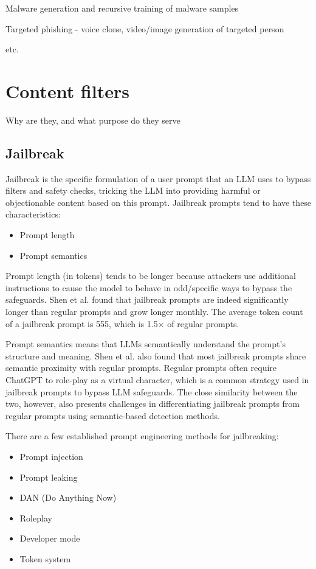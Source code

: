 Malware generation and recursive training of malware samples

Targeted phishing - voice clone, video/image generation of targeted person

etc.

\section{Content filters}
Why are they, and what purpose do they serve

\subsection{Jailbreak}
Jailbreak is the specific formulation of a user prompt that an LLM uses to bypass filters and safety checks, tricking the LLM into providing harmful or objectionable content based on this prompt.
Jailbreak prompts tend to have these characteristics:
\begin{itemize}
    \item Prompt length
    \item Prompt semantics
\end{itemize}

Prompt length (in tokens) tends to be longer because attackers use additional instructions to cause the model to behave in odd/specific ways to bypass the safeguards.
Shen et al.\cite{shen2024donowcharacterizingevaluating} found that jailbreak prompts are indeed significantly longer than regular prompts and grow longer monthly. The average token count of a jailbreak prompt is 555, which is 1.5× of regular prompts.

Prompt semantics means that LLMs semantically understand the prompt's structure and meaning. Shen et al.\cite{shen2024donowcharacterizingevaluating} also found that most jailbreak prompts share semantic proximity with regular prompts. Regular prompts often require ChatGPT to role-play as a virtual character, which is a common strategy used in jailbreak prompts to bypass LLM safeguards. The close similarity between the two, however, also presents challenges in differentiating jailbreak prompts from regular prompts using semantic-based detection methods.



There are a few established prompt engineering methods for jailbreaking:
\begin{itemize}
    \item Prompt injection
    \item Prompt leaking
    \item DAN (Do Anything Now)
    \item Roleplay
    \item Developer mode
    \item Token system
\end{itemize}

